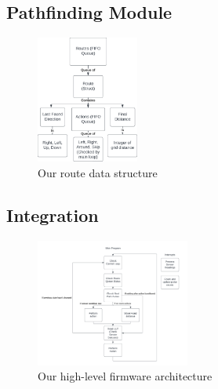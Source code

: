 \documentclass[conference]{IEEEtran}
\begin{document}
\subsection{Pathfinding Module}

\begin{figure}[htbp]
	\centerline{\includegraphics[width=0.3\textwidth]{pathfinding-route-struct.png}}
	\caption{Our route data structure}
	\label{fig:pathfinding-route-struct}
\end{figure}

\subsection{Integration}

\begin{figure}[htbp]
	\centerline{\includegraphics[width=0.45\textwidth]{integration-flowchart.png}}
	\caption{Our high-level firmware architecture}
	\label{fig:integration-flowchart}
\end{figure}
\end{document}
